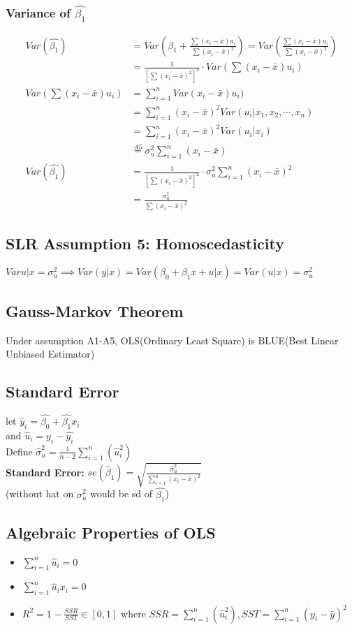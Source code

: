\documentclass{article}
\theoremstyle{definition}
\theoremstyle{thrm}
\theoremstyle{lma}
\theoremstyle{ppst}
\theoremstyle{crlr}
\begin{document}
\subsubsection{Variance of $\hat{\beta_1}$}
\begin{align*}
	Var(\hat{\beta_1}) &= Var(\beta_1+\frac{\sum(x_i-\bar{x})u_i}{\sum(x_i-\bar{x})^2}) = Var(\frac{\sum(x_i-\bar{x})u_i}{\sum(x_i-\bar{x})^2})\\
	&=\frac{1}{[\sum(x_i-\bar{x})^2]^2}\cdot Var(\sum(x_i-\bar{x})u_i)\\
	Var(\sum(x_i-\bar{x})u_i)&= \sum_{i=1}^nVar(x_i-\bar{x})u_i)\\
	&= \sum_{i=1}^n(x_i-\bar{x})^2Var(u_i|x_1,x_2,\cdots, x_n)\\
	&= \sum_{i=1}^n(x_i-\bar{x})^2Var(u_i|x_i)\\
	&\stackrel{A5}{=}\sigma_{u}^2 \sum_{i=1}^n(x_i-\bar{x})\\
	Var(\hat{\beta_1}) &=\frac{1}{[\sum(x_i-\bar{x})^2]^2}\cdot\sigma_{u}^2 \sum_{i=1}^n(x_i-\bar{x})^2\\
	&= \frac{\sigma_{u}^2}{\sum(x_i-\bar{x})^2}
\end{align*}
\subsection{SLR Assumption 5: Homoscedasticity}
$Var{u|x} = \sigma_u^2\implies Var(y|x) = Var(\beta_0+\beta_1x+u|x) = Var(u|x) = \sigma_u^2$
\subsection{Gauss-Markov Theorem}
Under assumption A1-A5, OLS(Ordinary Least Square) is BLUE(Best Linear Unbiased Estimator)

\subsection{Standard Error}
let $\hat{y}_i = \hat{\beta_0}+\hat{\beta_1}x_i$\\
and $\hat{u}_i = y_i-\hat{y_i}$\\
Define $\hat{\sigma}_u^2 = \frac{1}{n-2}\sum_{i=1}^n(\hat{u}_i^2)$\\
\textbf{Standard Error: } $se(\hat{\beta}_1) = \sqrt{\frac{\hat{\sigma}_u^2}{\sum_{i=1}^n(x_i-\bar{x})^2}}$\\
(without hat on $\sigma_u^2$ would be sd of $\hat{\beta_1}$)

\subsection{Algebraic Properties of OLS}
\begin{itemize}
	\item $\sum_{i=1}^n\hat{u}_i = 0$
	\item $\sum_{i=1}^n\hat{u}_ix_i = 0$
	\item $R^2 = 1-\frac{SSR}{SST}\in [0,1]$ where $SSR = \sum_{i=1}^n(\hat{u}_i^2), SST = \sum_{i=1}^n(y_i-\bar{y})^2$
\end{itemize}
\end{document}
